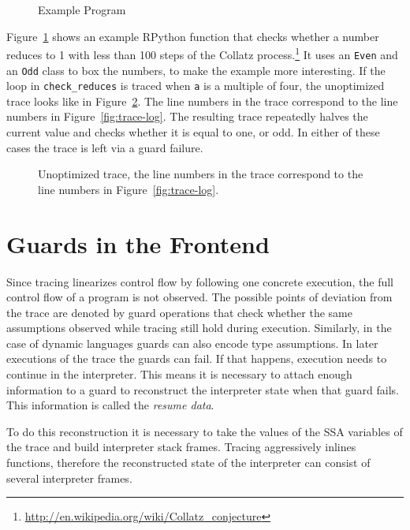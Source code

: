 \documentclass[10pt,preprint]{sigplanconf}
\begin{document}
\begin{figure}
    
    \caption{Example Program}
    \label{fig:example}
\end{figure}

Figure~\ref{fig:example} shows an example RPython function that checks
whether a number reduces to 1 with less than 100 steps of the Collatz process.\footnote{\url{http://en.wikipedia.org/wiki/Collatz_conjecture}}
It uses an \lstinline{Even} and an \lstinline{Odd} class to box the numbers, to
make the example more interesting. If the loop in \lstinline{check_reduces} is
traced when \lstinline{a} is a multiple of four, the unoptimized
trace looks like in Figure~\ref{fig:unopt-trace}. The line numbers in the trace
correspond to the line numbers in Figure~\ref{fig:trace-log}. The resulting
trace repeatedly halves the current value and checks whether it is equal to
one, or odd. In either of these cases the trace is left via a guard failure.

\begin{figure}
    
    \caption{Unoptimized trace, the line numbers in the trace correspond to the line numbers in Figure~\ref{fig:trace-log}.}
    \label{fig:unopt-trace}
\end{figure}

\section{Guards in the Frontend} %
\label{sec:Resume Data}

Since tracing linearizes control flow by following one concrete execution,
the full control flow of a program is not observed.
The possible points of deviation from the trace are denoted by guard operations
that check whether the same assumptions observed while tracing
still hold during execution.
Similarly, in the case of dynamic languages guards can also encode type
assumptions.
In later executions of the trace the guards can fail.
If that happens, execution needs to continue in the interpreter.
This means it is necessary to attach enough information to a guard
to reconstruct the interpreter state when that guard fails.
This information is called the \emph{resume data}.

To do this reconstruction it is necessary to take the values of the SSA
variables of the trace and build interpreter stack frames.  Tracing
aggressively inlines functions, therefore the reconstructed state of the
interpreter can consist of several interpreter frames.
\end{document}
